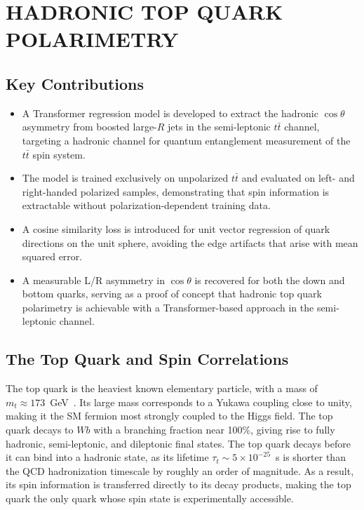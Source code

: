 \begingroup
\clearpage%
\let\clearpage\relax%
\vspace*{-16pt}%
\chapter[HADRONIC TOP QUARK POLARIMETRY]{HADRONIC TOP QUARK POLARIMETRY}
\label{chap:top_polarimetry}
\endgroup

\section{Key Contributions}

\begin{itemize}
    \item A Transformer regression model is developed to extract the hadronic $\cos\theta$ asymmetry from boosted large-$R$ jets in the semi-leptonic $t\bar{t}$ channel, targeting a hadronic channel for quantum entanglement measurement of the $t\bar{t}$ spin system.
    \item The model is trained exclusively on unpolarized $t\bar{t}$ and evaluated on left- and right-handed polarized samples, demonstrating that spin information is extractable without polarization-dependent training data.
	\item A cosine similarity loss is introduced for unit vector regression of quark directions on the unit sphere, avoiding the edge artifacts that arise with mean squared error.
    \item A measurable L/R asymmetry in $\cos\theta$ is recovered for both the down and bottom quarks, serving as a proof of concept that hadronic top quark polarimetry is achievable with a Transformer-based approach in the semi-leptonic channel.
\end{itemize}

\section{The Top Quark and Spin Correlations}

The top quark is the heaviest known elementary particle, with a mass of $m_t \approx 173$~GeV~\cite{PDG2022}. 
Its large mass corresponds to a Yukawa coupling close to unity, making it the SM fermion most strongly coupled to the Higgs field.
The top quark decays to $Wb$ with a branching fraction near 100\%, giving rise to fully hadronic, semi-leptonic, and dileptonic final states. 
The top quark decays before it can bind into a hadronic state, as its lifetime $\tau_t \sim 5 \times 10^{-25}$~s is shorter than the QCD hadronization timescale by roughly an order of magnitude. 
As a result, its spin information is transferred directly to its decay products, making the top quark the only quark whose spin state is experimentally accessible.

